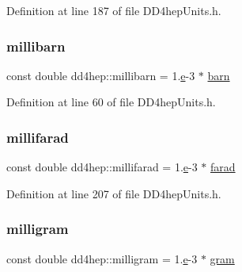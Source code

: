 Definition at line 187 of file D\+D4hep\+Units.\+h.

\hypertarget{namespacedd4hep_af4d3d1b2777005b2e1406992fe27e976}{}\label{namespacedd4hep_af4d3d1b2777005b2e1406992fe27e976} 
\subsubsection{\texorpdfstring{millibarn}{millibarn}}
{\footnotesize\ttfamily const double dd4hep\+::millibarn = 1.\hyperlink{_volumes_8cpp_a8a9a1f93e9b09afccaec215310e64142}{e}-\/3 $\ast$ \hyperlink{namespacedd4hep_a561a205dfb5e2f3151e032ad640f1d35}{barn}\hspace{0.3cm}{\ttfamily [static]}}



Definition at line 60 of file D\+D4hep\+Units.\+h.

\hypertarget{namespacedd4hep_ab6b260f94b42644b41c2d1e8618ae238}{}\label{namespacedd4hep_ab6b260f94b42644b41c2d1e8618ae238} 
\subsubsection{\texorpdfstring{millifarad}{millifarad}}
{\footnotesize\ttfamily const double dd4hep\+::millifarad = 1.\hyperlink{_volumes_8cpp_a8a9a1f93e9b09afccaec215310e64142}{e}-\/3 $\ast$ \hyperlink{namespacedd4hep_a520a532361cb9086c6d4c69ac195ddba}{farad}\hspace{0.3cm}{\ttfamily [static]}}



Definition at line 207 of file D\+D4hep\+Units.\+h.

\hypertarget{namespacedd4hep_ad2ffff3db78948c1ad083f3f41b26acb}{}\label{namespacedd4hep_ad2ffff3db78948c1ad083f3f41b26acb} 
\subsubsection{\texorpdfstring{milligram}{milligram}}
{\footnotesize\ttfamily const double dd4hep\+::milligram = 1.\hyperlink{_volumes_8cpp_a8a9a1f93e9b09afccaec215310e64142}{e}-\/3 $\ast$ \hyperlink{namespacedd4hep_ab7942148388bbfa1f47578732153f293}{gram}\hspace{0.3cm}{\ttfamily [static]}}



